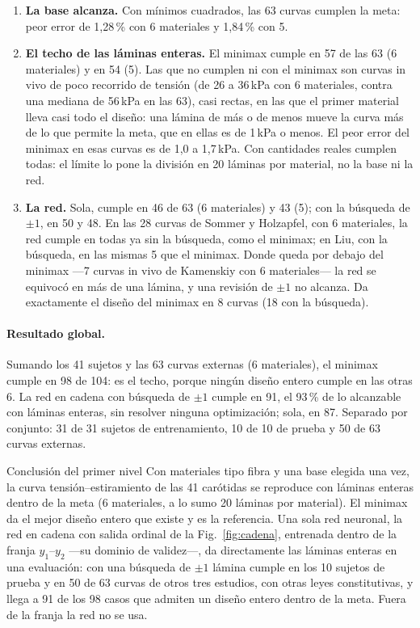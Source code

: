 \begin{enumerate}[label=(\roman*)]
\item \textbf{La base alcanza.} Con mínimos cuadrados, las 63 curvas cumplen la meta: peor error de 1,28\,\% con 6 materiales y 1,84\,\% con 5.
\item \textbf{El techo de las láminas enteras.} El minimax cumple en 57 de las 63 (6 materiales) y en 54 (5). Las que no cumplen ni con el minimax son curvas in vivo de poco recorrido de tensión (de 26 a 36\,kPa con 6 materiales, contra una mediana de 56\,kPa en las 63), casi rectas, en las que el primer material lleva casi todo el diseño: una lámina de más o de menos mueve la curva más de lo que permite la meta, que en ellas es de 1\,kPa o menos. El peor error del minimax en esas curvas es de 1,0 a 1,7\,kPa. Con cantidades reales cumplen todas: el límite lo pone la división en 20 láminas por material, no la base ni la red.
\item \textbf{La red.} Sola, cumple en 46 de 63 (6 materiales) y 43 (5); con la búsqueda de $\pm1$, en 50 y 48. En las 28 curvas de Sommer y Holzapfel, con 6 materiales, la red cumple en todas ya sin la búsqueda, como el minimax; en Liu, con la búsqueda, en las mismas 5 que el minimax. Donde queda por debajo del minimax ---7 curvas in vivo de Kamenskiy con 6 materiales--- la red se equivocó en más de una lámina, y una revisión de $\pm1$ no alcanza. Da exactamente el diseño del minimax en 8 curvas (18 con la búsqueda).
\end{enumerate}

\paragraph{Resultado global.} Sumando los 41 sujetos y las 63 curvas externas (6 materiales), el minimax cumple en 98 de 104: es el techo, porque ningún diseño entero cumple en las otras 6. La red en cadena con búsqueda de $\pm1$ cumple en 91, el 93\,\% de lo alcanzable con láminas enteras, sin resolver ninguna optimización; sola, en 87. Separado por conjunto: 31 de 31 sujetos de entrenamiento, 10 de 10 de prueba y 50 de 63 curvas externas.

\begin{caja}{Conclusión del primer nivel}
Con materiales tipo fibra y una base elegida una vez, la curva tensión--estiramiento de las 41 carótidas se reproduce con láminas enteras dentro de la meta (6 materiales, a lo sumo 20 láminas por material). El minimax da el mejor diseño entero que existe y es la referencia. Una sola red neuronal, la red en cadena con salida ordinal de la Fig.~\ref{fig:cadena}, entrenada dentro de la franja $y_1$--$y_2$ ---su dominio de validez---, da directamente las láminas enteras en una evaluación: con una búsqueda de $\pm1$ lámina cumple en los 10 sujetos de prueba y en 50 de 63 curvas de otros tres estudios, con otras leyes constitutivas, y llega a 91 de los 98 casos que admiten un diseño entero dentro de la meta. Fuera de la franja la red no se usa.
\end{caja}

